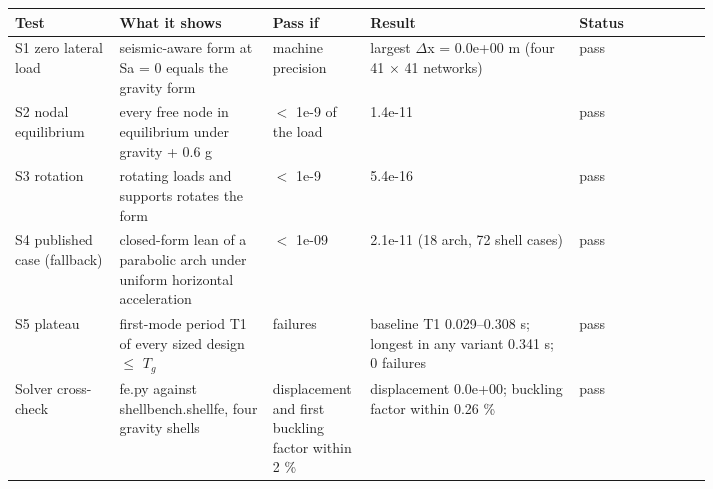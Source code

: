 \footnotesize
\begin{tabular}{>{\raggedright\arraybackslash}p{0.15\linewidth}>{\raggedright\arraybackslash}p{0.22\linewidth}>{\raggedright\arraybackslash}p{0.14\linewidth}>{\raggedright\arraybackslash}p{0.30\linewidth}l}
\toprule
Test & What it shows & Pass if & Result & Status \\
\midrule
S1 zero lateral load & seismic-aware form at Sa = 0 equals the gravity form & machine precision & largest $\Delta$x = 0.0e+00 m (four 41 $\times$ 41 networks) & pass \\
S2 nodal equilibrium & every free node in equilibrium under gravity + 0.6 g & $<$ 1e-9 of the load & 1.4e-11 & pass \\
S3 rotation & rotating loads and supports rotates the form & $<$ 1e-9 & 5.4e-16 & pass \\
S4 published case (fallback) & closed-form lean of a parabolic arch under uniform horizontal acceleration & $<$ 1e-09 & 2.1e-11 (18 arch, 72 shell cases) & pass \\
S5 plateau & first-mode period T1 of every sized design $\leq$ $T_{g}$ & 0 failures & baseline T1 0.029--0.308 s; longest in any variant 0.341 s; 0 failures & pass \\
Solver cross-check & fe.py against shellbench.shellfe, four gravity shells & displacement and first buckling factor within 2 \% & displacement 0.0e+00; buckling factor within 0.26 \% & pass \\
\bottomrule
\end{tabular}
